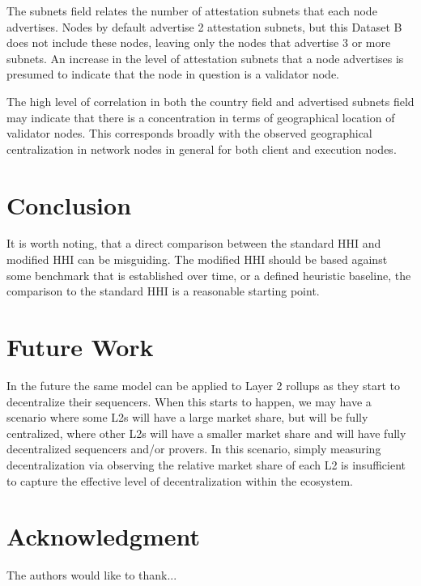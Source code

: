 \documentclass[conference]{IEEEtran}
\begin{document}
The subnets field relates the number of attestation subnets that each node advertises.  Nodes by default advertise 2 attestation subnets, but this Dataset B does not include these nodes, leaving only the nodes that advertise 3 or more subnets.  An increase in the level of attestation subnets that a node advertises is presumed to indicate that the node in question is a validator node.

The high level of correlation in both the country field and advertised subnets field may indicate that there is a concentration in terms of geographical location of validator nodes.  This corresponds broadly with the observed geographical centralization in network nodes in general for both client and execution nodes.

\section{Conclusion}

It is worth noting, that a direct comparison between the standard HHI and modified HHI can be misguiding.  The modified HHI should be based against some benchmark that is established over time, or a defined heuristic baseline, the comparison to the standard HHI is a reasonable starting point.


\section{Future Work}

In the future the same model can be applied to Layer 2 rollups as they start to decentralize their sequencers.  When this starts to happen, we may have a scenario where some L2s will have a large market share, but will be fully centralized, where other L2s will have a smaller market share and will have fully decentralized sequencers and/or provers.  In this scenario, simply measuring decentralization via observing the relative market share of each L2 is insufficient to capture the effective level of decentralization within the ecosystem.



\section*{Acknowledgment}


The authors would like to thank...


\ifCLASSOPTIONcaptionsoff
  \newpage
\fi
\end{document}
